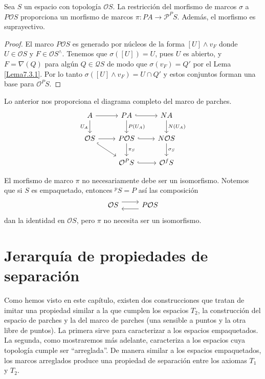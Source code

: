 \begin{lem}\label{Lema7.3.2}
    Sea $S$ un espacio con topología $\mathcal{O}S$. La restricción del morfismo de marcos $\sigma$ a $P\mathcal{O}S$ proporciona un morfismo de marcos $\pi\colon PA\to \mathcal{P}^PS$. Además, el morfismo es suprayectivo.
\end{lem}

\begin{proof}
    El marco $P\mathcal{O}S$ es generado por núcleos de la forma $[U]\wedge v_F$ donde $U\in \mathcal{O}S$ y $F\in \mathcal{O}S^\wedge$. Tenemos que $\sigma([U])=U$, pues $U$ es abierto, y $F=\nabla(Q)$ para algún $Q\in \mathcal{Q}S$ de modo que $\sigma(v_F)=Q'$ por el Lema \ref{Lema7.3.1}. Por lo tanto $\sigma([U]\wedge v_F)=U\cap Q'$ y estos conjuntos forman una base para $\mathcal{O}^PS$.
\end{proof}

Lo anterior nos proporciona el diagrama completo del marco de parches.
\[\begin{tikzcd}
	A & PA & NA \\
	{\mathcal{O}S} & {P\mathcal{O}S} & {N\mathcal{O}S} \\
	& {\mathcal{O}^PS} & {\mathcal{O}^fS}
	\arrow[from=1-1, to=1-2]
	\arrow["{U_A}"', from=1-1, to=2-1]
	\arrow[hook, from=1-2, to=1-3]
	\arrow["{P(U_A)}", from=1-2, to=2-2]
	\arrow["{N(U_A)}", from=1-3, to=2-3]
	\arrow[from=2-1, to=2-2]
	\arrow[hook, from=2-1, to=3-2]
	\arrow[hook, from=2-2, to=2-3]
	\arrow["{\pi_S}", from=2-2, to=3-2]
	\arrow["{\sigma_S}", from=2-3, to=3-3]
	\arrow[hook, from=3-2, to=3-3]
\end{tikzcd}\]

El morfismo de marco $\pi$ no necesariamente debe ser un isomorfismo. Notemos que si $S$ es empaquetado, entonces $^pS=P$ así las composición
\[\begin{tikzcd}
	{\mathcal{O}S} & {P\mathcal{O}S}
	\arrow[shift left=2, from=1-1, to=1-2]
	\arrow[shift left=2, from=1-2, to=1-1]
\end{tikzcd}\]
dan la identidad en $\mathcal{O}S$, pero $\pi$ no necesita ser un isomorfismo.

\section{Jerarquía de propiedades de separación}\label{Marcos arreglados}

Como hemos visto en este capítulo, existen dos construcciones que tratan de imitar una propiedad similar a la que cumplen los espacios $T_2$, la construcción del espacio de parches y la del marco de parches (una sensible a puntos y la otra libre de puntos). La primera sirve para caracterizar a los espacios empaquetados. La segunda, como mostraremos más adelante, caracteriza a los espacios cuya topología cumple ser ``arreglada''. De manera similar a los espacios empaquetados, los marcos arreglados produce una propiedad de separación entre los axiomas $T_1$ y $T_2$.

